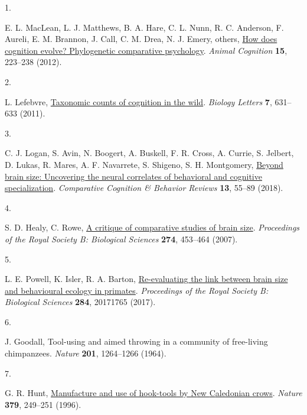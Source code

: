\documentclass[
  man,floatsintext]{apa6}
\newlength{\cslhangindent}
\newlength{\csllabelwidth}
\newlength{\cslentryspacingunit} %
\newenvironment{CSLReferences}[2] %
 {%
  \setlength{\parindent}{0pt}
  \ifodd #1
  \let\oldpar\par
  \def\par{\hangindent=\cslhangindent\oldpar}
  \fi
  \setlength{\parskip}{#2\cslentryspacingunit}
 }%
 {}
\newcommand{\CSLLeftMargin}[1]{\parbox[t]{\csllabelwidth}{#1}}
\newcommand{\CSLRightInline}[1]{\parbox[t]{\linewidth - \csllabelwidth}{#1}\break}
\begin{document}
\hypertarget{refs}{}
\begin{CSLReferences}{0}{0}
\leavevmode{}%
\CSLLeftMargin{1. }%
\CSLRightInline{E. L. MacLean, L. J. Matthews, B. A. Hare, C. L. Nunn, R. C. Anderson, F. Aureli, E. M. Brannon, J. Call, C. M. Drea, N. J. Emery, others, \href{https://doi.org/10.1007/s10071-011-0448-8}{How does cognition evolve? Phylogenetic comparative psychology}. \emph{Animal Cognition} \textbf{15}, 223--238 (2012).}

\leavevmode{}%
\CSLLeftMargin{2. }%
\CSLRightInline{L. Lefebvre, \href{https://doi.org/10.1098/rsbl.2010.0556}{Taxonomic counts of cognition in the wild}. \emph{Biology Letters} \textbf{7}, 631--633 (2011).}

\leavevmode{}%
\CSLLeftMargin{3. }%
\CSLRightInline{C. J. Logan, S. Avin, N. Boogert, A. Buskell, F. R. Cross, A. Currie, S. Jelbert, D. Lukas, R. Mares, A. F. Navarrete, S. Shigeno, S. H. Montgomery, \href{https://doi.org/10.3819/CCBR.2018.130008}{Beyond brain size: Uncovering the neural correlates of behavioral and cognitive specialization}. \emph{Comparative Cognition \& Behavior Reviews} \textbf{13}, 55--89 (2018).}

\leavevmode{}%
\CSLLeftMargin{4. }%
\CSLRightInline{S. D. Healy, C. Rowe, \href{https://doi.org/10.1098/rspb.2006.3748}{A critique of comparative studies of brain size}. \emph{Proceedings of the Royal Society B: Biological Sciences} \textbf{274}, 453--464 (2007).}

\leavevmode{}%
\CSLLeftMargin{5. }%
\CSLRightInline{L. E. Powell, K. Isler, R. A. Barton, \href{https://doi.org/10.1098/rspb.2017.1765}{Re-evaluating the link between brain size and behavioural ecology in primates}. \emph{Proceedings of the Royal Society B: Biological Sciences} \textbf{284}, 20171765 (2017).}

\leavevmode{}%
\CSLLeftMargin{6. }%
\CSLRightInline{J. Goodall, Tool-using and aimed throwing in a community of free-living chimpanzees. \emph{Nature} \textbf{201}, 1264--1266 (1964).}

\leavevmode{}%
\CSLLeftMargin{7. }%
\CSLRightInline{G. R. Hunt, \href{https://doi.org/10.1038/379249a0}{Manufacture and use of hook-tools by {N}ew {C}aledonian crows}. \emph{Nature} \textbf{379}, 249--251 (1996).}


\end{CSLReferences}
\end{document}
